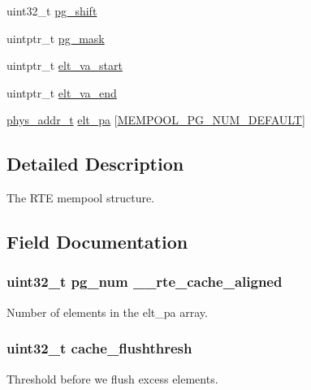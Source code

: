 \begin{DoxyCompactItemize}
\item 
uint32\+\_\+t \hyperlink{structrte__mempool_accb972310b9ffe52e66fb51b699eb2d6}{pg\+\_\+shift}
\item 
uintptr\+\_\+t \hyperlink{structrte__mempool_afae806f0ec59fb49b1578f20cd5aebbf}{pg\+\_\+mask}
\item 
uintptr\+\_\+t \hyperlink{structrte__mempool_a4e38c11736523a0fd4b508c0e5797735}{elt\+\_\+va\+\_\+start}
\item 
uintptr\+\_\+t \hyperlink{structrte__mempool_a7191a9fe4d62b69f2fa67c7713af39ac}{elt\+\_\+va\+\_\+end}
\item 
\hyperlink{rte__memory_8h_aeed7e715f3dcfddef6f34dec94037646}{phys\+\_\+addr\+\_\+t} \hyperlink{structrte__mempool_a1f424edf98249bd3d6816b65a3328dc4}{elt\+\_\+pa} \mbox{[}\hyperlink{rte__mempool_8h_a2f0648fad3d8d844ccf917cbebe9f741}{M\+E\+M\+P\+O\+O\+L\+\_\+\+P\+G\+\_\+\+N\+U\+M\+\_\+\+D\+E\+F\+A\+U\+L\+T}\mbox{]}
\end{DoxyCompactItemize}


\subsection{Detailed Description}
The R\+T\+E mempool structure. 

\subsection{Field Documentation}
\hypertarget{structrte__mempool_a5b84b713710582f17581cdbf4278d7a5}{}
\subsubsection[{\+\_\+\+\_\+rte\+\_\+cache\+\_\+aligned}]{\setlength{\rightskip}{0pt plus 5cm}uint32\+\_\+t pg\+\_\+num \+\_\+\+\_\+rte\+\_\+cache\+\_\+aligned}\label{structrte__mempool_a5b84b713710582f17581cdbf4278d7a5}
Number of elements in the elt\+\_\+pa array. \hypertarget{structrte__mempool_a30ead2c1b80bd7489e6571713424b633}{}
\subsubsection[{cache\+\_\+flushthresh}]{\setlength{\rightskip}{0pt plus 5cm}uint32\+\_\+t cache\+\_\+flushthresh}\label{structrte__mempool_a30ead2c1b80bd7489e6571713424b633}
Threshold before we flush excess elements. \hypertarget{structrte__mempool_ac0fc8e6a5ca95e81e5d94522c86cfc9c}{}
